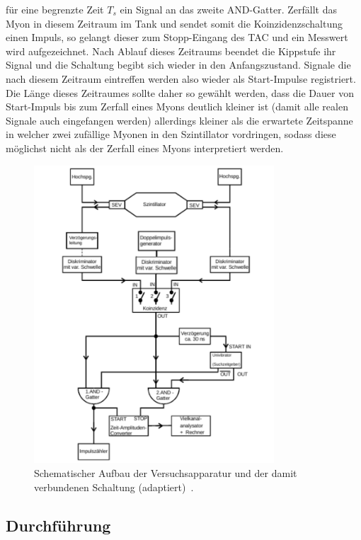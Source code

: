 für eine begrenzte Zeit $T_s$ ein Signal an das zweite AND-Gatter. Zerfällt das
Myon in diesem Zeitraum im Tank und sendet somit die Koinzidenzschaltung einen
Impuls, so gelangt dieser zum Stopp-Eingang des TAC und ein Messwert wird
aufgezeichnet. Nach Ablauf dieses Zeitraums beendet die Kippstufe ihr Signal und
die Schaltung begibt sich wieder in den Anfangszustand. Signale die nach diesem
Zeitraum eintreffen werden also wieder als Start-Impulse registriert. Die Länge
dieses Zeitraumes sollte daher so gewählt werden, dass die Dauer von Start-Impuls
bis zum Zerfall eines Myons deutlich kleiner ist (damit alle realen Signale
auch eingefangen werden) allerdings kleiner als die erwartete Zeitspanne in
welcher zwei zufällige Myonen in den Szintillator vordringen, sodass diese
möglichst nicht als der Zerfall eines Myons interpretiert werden. %

\begin{figure}[htb]
  \centering
  \includegraphics[width=0.8\textwidth]{figures/versuchsaufbau_adapt.pdf}
  \caption{Schematischer Aufbau der Versuchsapparatur und der damit verbundenen Schaltung (adaptiert)~\cite{V01}.}
  \label{fig:aufbau}
\end{figure}

\subsection{Durchführung}

